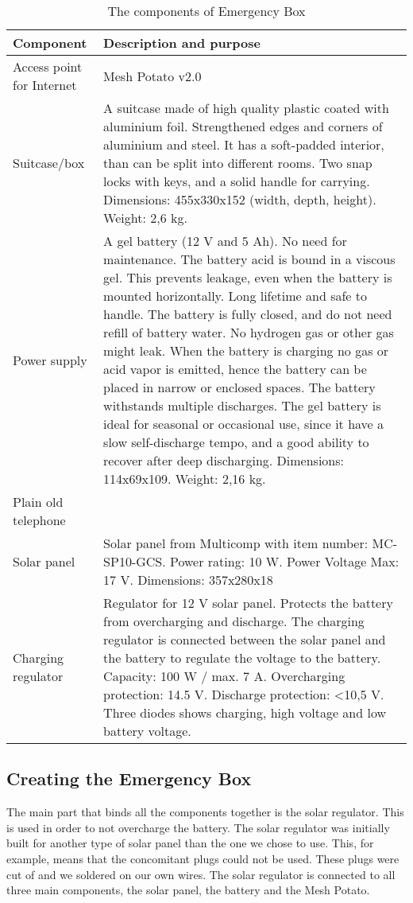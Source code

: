 \begin{center}
\begin{table}[t]
\caption{\label{tab:components}The components of Emergency Box}
    \begin{tabular}{ | l | p{9cm} |}
    \hline
    \textbf{Component} & \textbf{Description and purpose} \\ 
    \hline
    Access point for Internet &  Mesh Potato v2.0\\ 
    \hline
    Suitcase/box &  A suitcase made of high quality plastic coated with aluminium foil. Strengthened edges and corners of aluminium and steel. It has a soft-padded interior, than can be split into different rooms. Two snap locks with keys, and a solid handle for carrying. Dimensions: 455x330x152 (width, depth, height). Weight: 2,6 kg. \\ 
    \hline
    Power supply & A gel battery (12 V and 5 Ah). No need for maintenance. The battery acid is bound in a viscous gel. This prevents leakage, even when the battery is mounted horizontally. Long lifetime and safe to handle. The battery is fully closed, and do not need refill of battery water. No hydrogen gas or other gas might leak. When the battery is charging no gas or acid vapor is emitted, hence the battery can be placed in narrow or enclosed spaces. The battery withstands multiple discharges. The gel battery is ideal for seasonal or occasional use, since it have a slow self-discharge tempo, and a good ability to recover after deep discharging. Dimensions: 114x69x109. Weight: 2,16 kg. \\
    \hline
    Plain old telephone & \\
	\hline
	Solar panel & Solar panel from Multicomp with item number: MC-SP10-GCS. Power rating: 10 W. Power Voltage Max: 17 V. Dimensions: 357x280x18\\
	\hline
	Charging regulator & Regulator for 12 V solar panel. Protects the battery from overcharging and discharge. The charging regulator is connected between the solar panel and the battery to regulate the voltage to the battery. Capacity: 100 W / max. 7 A. Overcharging protection: 14.5 V. Discharge protection: <10,5 V. Three diodes shows charging, high voltage and low battery voltage. \\
	\hline
    \end{tabular}
   \end{table}
\end{center}

\subsection{Creating the Emergency Box}
The main part that binds all the components together is the solar regulator. This is used in order to not overcharge the battery. The solar regulator was initially built for another type of solar panel than the one we chose to use. This, for example, means that the concomitant plugs could not be used. These plugs were cut of and we soldered on our own wires. The solar regulator is connected to all three main components, the solar panel, the battery and the Mesh Potato. 

